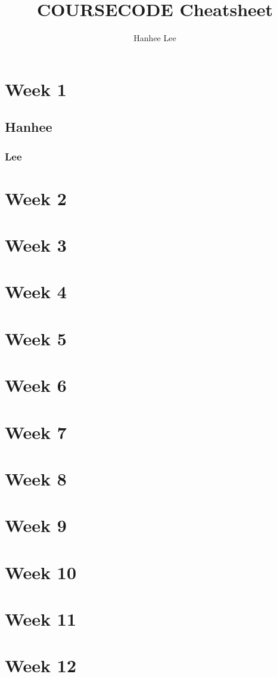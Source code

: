 \documentclass{article}
\title{COURSECODE Cheatsheet}
\author{Hanhee Lee}
\begin{document}
    \maketitle
    \tableofcontents
    \listoffigures
    \section{Week 1}
    \subsection{Hanhee}
    \subsubsection{Lee}
    \section{Week 2}
    \section{Week 3}
    \section{Week 4}
    \section{Week 5}
    \section{Week 6}
    \section{Week 7}
    \section{Week 8}
    \section{Week 9}
    \section{Week 10}
    \section{Week 11}
    \section{Week 12}
\end{document}
